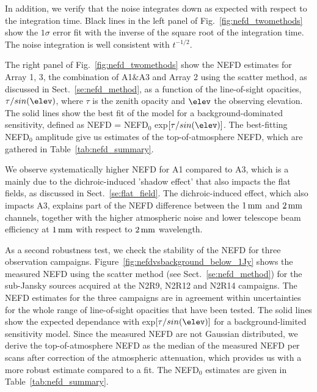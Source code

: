 In addition, we verify that the noise integrates down as expected with
respect to the integration time. Black lines in the left panel of
Fig.~\ref{fig:nefd_twomethods} show the $1\sigma$ error fit with the
inverse of the square root of the integration time. The noise
integration is well consistent with $t^{-1/2}$.

The right panel of Fig.~\ref{fig:nefd_twomethods} show the NEFD
estimates for  Array 1, 3, the combination of A1$\&$A3 and Array 2
using the scatter method, as discussed in Sect.~\ref{se:nefd_method},
as a function of the line-of-sight opacities, $\tau/sin(\elev)$,
where $\tau$ is the zenith opacity and $\elev$ the observing
elevation. The solid lines show the best fit of the model for a
background-dominated sensitivity,
defined as NEFD = NEFD$_0$ exp${[\tau/sin(\elev)]}$. The best-fitting
NEFD$_0$ amplitude give us estimates of the
top-of-atmosphere NEFD, which are gathered in
Table~\ref{tab:nefd_summary}.

We observe systematically higher NEFD for A1 compared to
A3, which is a mainly due to the dichroic-induced 'shadow effect' that
also impacts the flat fields, as discussed in
Sect.~\ref{se:flat_field}.
The dichroic-induced effect, which also impacts
A3, explains part of the NEFD difference between the $1\, \rm{mm}$ and
$2\, \rm{mm}$ channels, together with the higher atmospheric noise and
lower telescope beam efficiency at $1\, \rm{mm}$ with respect to $2\,
\rm{mm}$ wavelength.   

As a second robustness test, we check the stability of the NEFD for
three observation campaigns. Figure~\ref{fig:nefdvsbackground_below_1Jy} shows the
measured NEFD using the scatter method (see Sect.~\ref{se:nefd_method}) for the
sub-Jansky sources acquired at the N2R9, N2R12 and N2R14
campaigns. The NEFD estimates for the
three campaigns are in agreement within uncertainties for the whole
range of line-of-sight opacities that have been tested.
The solid lines show the expected dependance with
exp${[\tau/sin(\elev)]}$ for a background-limited sensitivity
model. Since the measured NEFD are not Gaussian distributed, we
derive the top-of-atmosphere NEFD as the median of the measured NEFD
per scans after correction of the atmospheric attenuation, which provides us
with a more robust estimate compared to a fit. The NEFD$_0$ estimates
are given in Table~\ref{tab:nefd_summary}.

